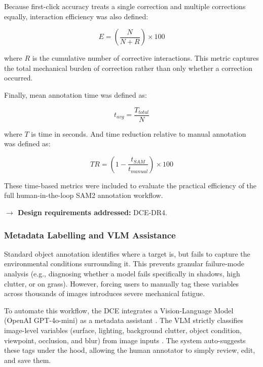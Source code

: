 Because first-click accuracy treats a single correction and multiple corrections equally, interaction efficiency was also defined:

\begin{equation}
\label{eq:interaction_efficiency}
E = \left(\frac{N}{N + R}\right) \times 100
\end{equation}

\noindent where $R$ is the cumulative number of corrective interactions. This metric captures the total mechanical burden of correction rather than only whether a correction occurred.

Finally, mean annotation time was defined as:

\begin{equation}
\label{eq:mean_annotation_time}
t_{avg} = \frac{T_{total}}{N}
\end{equation}

\noindent where $T$ is time in seconds. And time reduction relative to manual annotation was defined as:

\begin{equation}
\label{eq:time_reduction}
TR = \left(1 - \frac{t_{SAM}}{t_{manual}}\right) \times 100
\end{equation}

These time-based metrics were included to evaluate the practical efficiency of the full human-in-the-loop SAM2 annotation workflow.

\vspace{0.5em}
\noindent\textbf{$\rightarrow$ Design requirements addressed:} DCE-DR4.

\subsubsection{Metadata Labelling and VLM Assistance}

Standard object annotation identifies where a target is, but fails to capture the environmental conditions surrounding it. This prevents granular failure-mode analysis (e.g., diagnosing whether a model fails specifically in shadows, high clutter, or on grass). However, forcing users to manually tag these variables across thousands of images introduces severe mechanical fatigue.

To automate this workflow, the DCE integrates a Vision-Language Model (OpenAI GPT-4o-mini) as a metadata assistant \cite{openai_gpt4o_mini_docs}. The VLM strictly classifies image-level variables (surface, lighting, background clutter, object condition, viewpoint, occlusion, and blur) from image inputs \cite{openai_vision_docs}. The system auto-suggests these tags under the hood, allowing the human annotator to simply review, edit, and save them.

